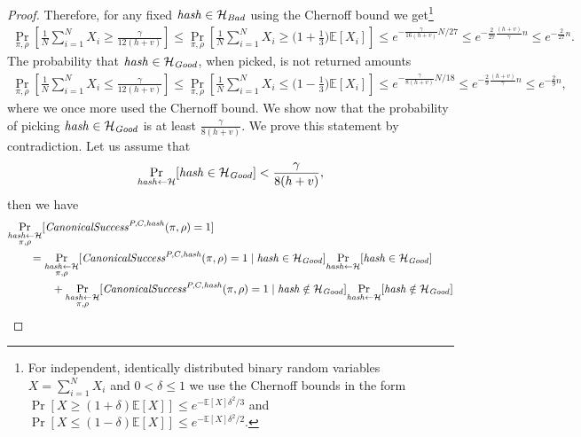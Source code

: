 \begin{proof}
Therefore, for any fixed $\operatorname{\mathit{hash}} \in \mathcal{H}_{\mathit{Bad}}$ using the Chernoff bound we get\footnote{For independent, identically distributed binary
random variables $X = \sum_{i=1}^N X_i$ and $0 < \delta \leq 1$ we use the Chernoff bounds in the form
$\Pr[X \geq (1+\delta) \mathbb{E}[X]] \leq e^{- \mathbb{E}[X] \delta^2/3}$ and
$\Pr[X \leq (1-\delta) \mathbb{E}[X]] \leq e^{- \mathbb{E}[X] \delta^2/2}$.}
\begin{align*}
  \underset{\pi,\rho}{\Pr} \left[\frac{1}{N} \sum_{i=1}^{N} X_i \geq \frac{\gamma}{12(h+v)} \right] \leq
  \underset{\pi, \rho}{\Pr}\left[\frac{1}{N} \sum_{i=1}^{N} X_i \geq \bigl(1 + \frac{1}{3}\bigr) \mathbb{E}[X_i]\right] \leq
  e^{-{\frac{\gamma}{16(h+v)}} N / 27} \leq e^{-\frac{2}{27}\frac{(h+v)}{\gamma}n} \leq e^{-\frac{2}{27}n}.
\end{align*}
%
The probability that $\operatorname{\mathit{hash}} \in \mathcal{H}_{\mathit{Good}}$, when picked, is not returned amounts
\begin{align*}
  \underset{\pi, \rho}{\Pr}\left[\frac{1}{N} \sum_{i=1}^{N} X_i \leq \frac{\gamma}{12(h+v)}\right] \leq
  \underset{\pi, \rho}{\Pr}\left[\frac{1}{N} \sum_{i=1}^{N} X_i \leq \bigl(1 - \frac{1}{3}\bigr)\mathbb{E}[X_i]\right]
  \leq e^{-{\frac{\gamma}{8(h+v)}} N / 18} \leq e^{-\frac{2}{9} \frac{(h+v)}{\gamma}n} \leq e^{-\frac{2}{9}n},
\end{align*}
where we once more used the Chernoff bound.
We show now that the probability of picking $\operatorname{\mathit{hash}} \in \mathcal{H}_{\mathit{Good}}$ is at least $\frac{\gamma}{8(h+v)}$.
We prove this statement by contradiction. Let us assume that
\begin{align}
  \label{ass:hash_max_prob}
\underset{\operatorname{\mathit{hash}} \leftarrow \mathcal{H}}{\Pr}[\operatorname{\mathit{hash}} \in \mathcal{H}_{\mathit{Good}}] < \frac{\gamma}{8(h+v)},
\end{align}
then we have
\begin{align*}
  &\underset{\substack{\hash \leftarrow \cH \\ \pi, \rho}}{\Pr}[\CanonicalSuccess^{P,C,\hash}(\pi, \rho) = 1] \\
  &\IndI = \underset{\substack{ \hash \leftarrow \cH \\ \pi, \rho}}{\Pr}[\CanonicalSuccess^{P,C,\hash}(\pi, \rho) = 1 \mid \hash \in \cH_{\mathit{Good}}]
  \underset{\hash \leftarrow \cH}{\Pr}[\hash \in \cH_{\mathit{Good}}] \\
  & \IndII + \underset{\substack{\hash \leftarrow \cH \\ \pi, \rho}}{\Pr}[\CanonicalSuccess^{P,C,\hash}(\pi, \rho) = 1 \mid \hash \notin \cH_{\mathit{Good}}]
  \underset{\hash \leftarrow \cH}{\Pr}[\hash \notin \cH_{\mathit{Good}}] \\

\end{align*}
\end{proof}
